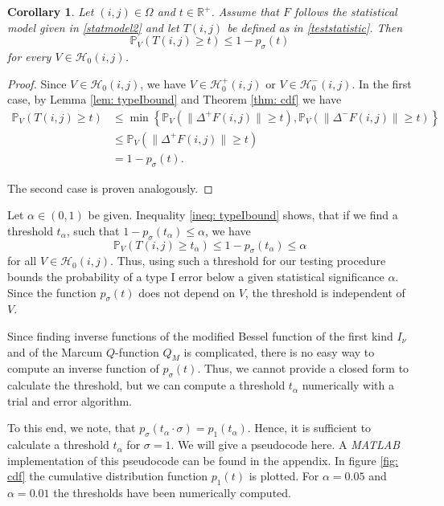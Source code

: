 \documentclass[a4paper,12pt]{article}
\newcommand{\norm}[1]{\lVert#1\rVert}
\theoremstyle{plain}
\newtheorem{corollary}[theorem]{Corollary}
\theoremstyle{definition}
\begin{document}
\begin{corollary}
	Let $(i, j) \in \Omega$ and $t \in \mathbb{R}^+$. Assume that $F$ follows the statistical model given in \eqref{statmodel2} and let $T(i, j)$ be defined as in \eqref{teststatistic}. Then
	\begin{equation}\label{ineq: typeIbound}
		\mathbb{P}_V( T(i, j) \geq t ) \leq 1 - p_\sigma(t)
	\end{equation}
	for every $V \in \mathcal{H}_0(i, j)$.
\end{corollary}
\begin{proof}
	Since $V \in \mathcal{H}_0(i, j)$, we have $V \in \mathcal{H}_0^+(i, j)$ or $V \in \mathcal{H}_0^-(i, j)$. In the first case, by Lemma \ref{lem: typeIbound} and Theorem \ref{thm: cdf} we have
	\begin{align*}
		\mathbb{P}_V( T(i, j) \geq t ) &\leq \min \left\{ \mathbb{P}_V( \norm{\Delta^+ F(i, j)} \geq t ), \mathbb{P}_V( \norm{\Delta^- F(i, j)} \geq t ) \right\} \\
		&\leq \mathbb{P}_V( \norm{\Delta^+ F(i, j)} \geq t ) \\
		&= 1 - p_\sigma(t).
	\end{align*}
	
	The second case is proven analogously.
\end{proof}

Let $\alpha \in (0, 1)$ be given. Inequality \eqref{ineq: typeIbound} shows, that if we find a threshold $t_\alpha$, such that $1 - p_\sigma(t_\alpha) \leq \alpha$, we have
\begin{equation}
	\mathbb{P}_V(T(i, j) \geq t_\alpha) \leq 1 - p_\sigma(t_\alpha) \leq \alpha
\end{equation}
for all $V \in \mathcal{H}_0(i, j)$. Thus, using such a threshold for our testing procedure bounds the probability of a type I error below a given statistical significance $\alpha$. Since the function $p_\sigma(t)$ does not depend on $V$, the threshold is independent of $V$.

Since finding inverse functions of the modified Bessel function of the first kind $I_\nu$ and of the Marcum $Q$-function $Q_M$ is complicated, there is no easy way to compute an inverse function of $p_\sigma(t)$. Thus, we cannot provide a closed form to calculate the threshold, but we can compute a threshold $t_\alpha$ numerically with a trial and error algorithm.

To this end, we note, that $p_\sigma(t_\alpha \cdot \sigma) = p_1(t_\alpha)$. Hence, it is sufficient to calculate a threshold $t_\alpha$ for $\sigma = 1$. We will give a pseudocode here. A \emph{MATLAB} implementation of this pseudocode can be found in the appendix. In figure \ref{fig: cdf} the cumulative distribution function $p_1(t)$ is plotted. For $\alpha = 0.05$ and $\alpha = 0.01$ the thresholds have been numerically computed.\\
\end{document}
